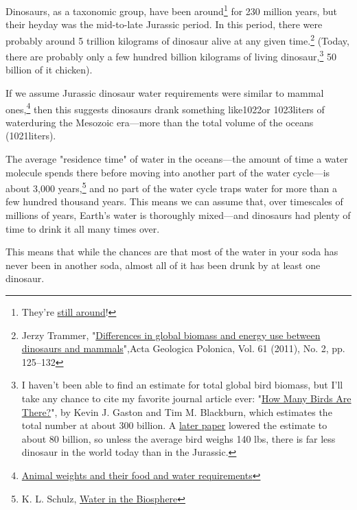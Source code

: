 {{Dinosaurs, as a taxonomic group, have been around{\footnote{They're \href{http://xkcd.com/1211/}{still around}!} } for 230 million years, but their heyday was the mid-to-late Jurassic period. In this period, there were probably around 5 trillion kilograms of dinosaur alive at any given time.{\footnote{Jerzy Trammer, "\href{http://agp.org.pl/table/pdf/61-2/trammer.pdf}{Differences in global biomass and energy use between dinosaurs and mammals}",Acta Geologica Polonica, Vol. 61 (2011), No. 2, pp. 125–132} } (Today, there are probably only a few hundred billion kilograms of living dinosaur,{\footnote{I haven't been able to find an estimate for total global bird biomass, but I'll take any chance to cite my favorite journal article ever: "\href{http://link.springer.com/article/10.1023\%2FA\%3A1018341530497}{How Many Birds Are There?}", by Kevin J. Gaston and Tim M. Blackburn, which estimates the total number at about 300 billion. A \href{http://rspb.royalsocietypublishing.org/content/270/1521/1293.full.pdf}{later paper} lowered the estimate to about 80 billion, so unless the average bird weighs 140 lbs, there is far less dinosaur in the world today than in the Jurassic.} } 50 billion of it chicken).}

{If we assume Jurassic dinosaur water requirements were similar to mammal ones,{\footnote{ \href{http://www.env.gov.bc.ca/wat/wq/reference/foodandwater.html}{Animal weights and their food and water requirements}} } then this suggests dinosaurs drank something like1022or 1023liters of waterduring the Mesozoic era—more than the total volume of the oceans (1021liters).}

{The average "residence time" of water in the oceans—the amount of time a water molecule spends there before moving into another part of the water cycle—is about 3,000 years,{\footnote{K. L. Schulz, \href{http://www.esf.edu/efb/schulz/Limnology/hydrologic.html}{Water in the Biosphere}} } and no part of the water cycle traps water for more than a few hundred thousand years. This means we can assume that, over timescales of millions of years, Earth's water is thoroughly mixed—and dinosaurs had plenty of time to drink it all many times over.}

{This means that while the chances are that most of the water in your soda has never been in another soda, almost all of it has been drunk by at least one dinosaur.}

}
